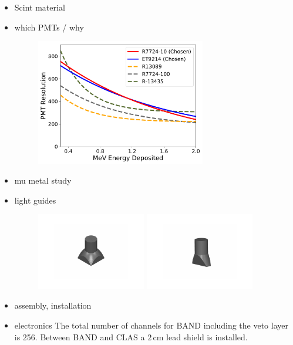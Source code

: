 \documentclass[review]{elsarticle}
\begin{document}
\begin{itemize}
\item Scint material
\item which PMTs / why
\begin{figure}[h!]
\centering
\includegraphics[width=0.7\textwidth]{test-stand/test-resolutions.pdf}
\caption{}
\label{fig:bandpmts}
\end{figure}

\item mu metal study
\item light guides
\begin{figure}[h!]
\centering
\includegraphics[width=0.45\textwidth]{parts/bar_lg.pdf}
\includegraphics[width=0.45\textwidth]{parts/veto_lg.pdf}
\caption{}
\label{fig:bandlg}
\end{figure}

\item assembly, installation
\item electronics
The total number of channels for BAND including the veto layer is 256. Between BAND and CLAS a $2\,\mathrm{cm}$ lead shield is installed.



\end{itemize}
\end{document}
